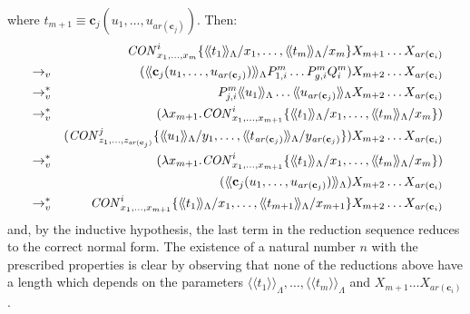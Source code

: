 \documentclass{LMCS}
\newcommand{\conone}{\mathbf{c}}
\newcommand{\varone}{x}
\newcommand{\vartwo}{y}
\newcommand{\varthree}{z}
\newcommand{\lambdafour}{P}
\newcommand{\lambdafive}{Q}
\newcommand{\termone}{t}
\newcommand{\termtwo}{u}
\newcommand{\cltermone}{X}
\newcommand{\TRSonetolambdaI}[1]{\langle\!\langle #1\rangle\!\rangle_{\Lambdaterms}}
\newcommand{\arity}[1]{\mathit{ar}(#1)}
\newcommand{\Lambdaterms}{\Lambda}
\newcommand{\rewrlambdav}{\rightarrow_v}
\newenvironment{varitemize}
{
\begin{list}{\labelitemi}
{\setlength{\itemsep}{0.0mm}
 \setlength{\topsep}{0.0mm}
 \setlength{\parindent}{0.0mm}
 \setlength{\parskip}{0.0mm}
 \setlength{\parsep}{0.0mm}
 \setlength{\partopsep}{0.0mm}
 \setlength{\leftmargin}{15pt}
 \setlength{\labelsep}{5pt}
 \setlength{\labelwidth}{10pt}}}
{
 \end{list} 
}
\newenvironment{varitemizeii}
{
\begin{list}{\labelitemiv}
{\setlength{\itemsep}{0.0mm}
 \setlength{\topsep}{0.0mm}
 \setlength{\parindent}{0.0mm}
 \setlength{\parskip}{0.0mm}
 \setlength{\parsep}{0.0mm}
 \setlength{\partopsep}{0.0mm}
 \setlength{\leftmargin}{15pt}
 \setlength{\labelsep}{5pt}
 \setlength{\labelwidth}{10pt}}}
{
 \end{list} 
}
\newcounter{number}
\begin{document}
\begin{varitemize}
\begin{varitemizeii}
    where $\termone_{m+1}\equiv\conone_j(\termtwo_{1},\ldots,\termtwo_{\arity{\conone_j}}) $. 
    Then:
    \begin{eqnarray*}
      &&\conslambda^i_{\varone_1,\ldots,\varone_{m}}\{\TRSonetolambdaI{\termone_1}/\varone_1,\ldots,
        \TRSonetolambdaI{\termone_{m}}/\varone_{m}\}\cltermone_{m+1}\ldots\cltermone_{\arity{\conone_i}}\\
      &\rewrlambdav&(\TRSonetolambdaI{\conone_j(\termtwo_{1},\ldots,\termtwo_{\arity{\conone_j}})}
        \lambdafour_{1,i}^m\ldots\lambdafour_{g,i}^m\lambdafive^m_i)\cltermone_{m+2}\ldots\cltermone_{\arity{\conone_i}}\\
      &\rewrlambdav^*&\lambdafour_{j,i}^m\TRSonetolambdaI{\termtwo_{1}}\ldots\TRSonetolambdaI{\termtwo_{\arity{\conone_j}}}
        \cltermone_{m+2}\ldots\cltermone_{\arity{\conone_i}}\\
      &\rewrlambdav^*&(\lambda\varone_{m+1}.\conslambda^i_{\varone_1,\ldots,\varone_{m+1}}\{\TRSonetolambdaI{\termone_1}/\varone_1,\ldots,
        \TRSonetolambdaI{\termone_{m}}/\varone_m\})\\
      &&(\conslambda^{j}_{\varthree_1,\ldots,\varthree_{\arity{\conone_j}}}\{\TRSonetolambdaI{\termtwo_1}/\vartwo_1,\ldots,
        \TRSonetolambdaI{\termone_{\arity{\conone_j}}}/\vartwo_{\arity{\conone_j}}\})\cltermone_{m+2}\ldots\cltermone_{\arity{\conone_i}}\\
      &\rewrlambdav^*&(\lambda\varone_{m+1}.\conslambda^i_{\varone_1,\ldots,\varone_{m+1}}\{\TRSonetolambdaI{\termone_1}/\varone_1,\ldots,
        \TRSonetolambdaI{\termone_{m}}/\varone_m\})\\
      &&(\TRSonetolambdaI{\conone_j(\termtwo_1,\ldots,\termtwo_{\arity{\conone_j}})})
        \cltermone_{m+2}\ldots\cltermone_{\arity{\conone_i}}\\
     &\rewrlambdav^*&\conslambda^i_{\varone_1,\ldots,\varone_{m+1}}\{\TRSonetolambdaI{\termone_1}/\varone_1,\ldots,
        \TRSonetolambdaI{\termone_{m+1}}/\varone_{m+1}\}\cltermone_{m+2}\ldots\cltermone_{\arity{\conone_i}}
    \end{eqnarray*}
    and, by the inductive hypothesis, the last term in the reduction sequence reduces to the correct
    normal form. The existence of a natural number $n$ with the prescribed properties is clear
    by observing that none of the reductions above have a length which depends on the parameters
    $\TRSonetolambdaI{\termone_1},\ldots,\TRSonetolambdaI{\termone_{m}}$ and $\cltermone_{m+1}\ldots\cltermone_{\arity{\conone_i}}$.
  \end{varitemizeii}
\end{varitemize}
\end{document}
